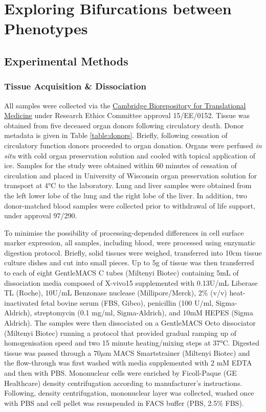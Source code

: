 \chapter{Exploring Bifurcations between Phenotypes}
\label{appendix:exploring}

\section{Experimental Methods}
\subsection{Tissue Acquisition \& Dissociation} 

All samples were collected via the \href{https://www.cbtm.group.cam.ac.uk}{Cambridge Biorepository for Translational Medicine} under Research Ethics Committee approval 15/EE/0152. Tissue was obtained from five deceased organ donors following circulatory death. Donor metadata is given in Table \ref{table:donors}. Briefly, following cessation of circulatory function donors proceeded to organ donation. Organs were perfused \emph{in situ} with cold organ preservation solution and cooled with topical application of ice. Samples for the study were obtained within 60 minutes of cessation of circulation and placed in University of Wisconsin organ preservation solution for transport at 4°C to the laboratory. Lung and liver samples were obtained from the left lower lobe of the lung and the right lobe of the liver. In addition, two donor-matched blood samples were collected prior to withdrawal of life support, under approval 97/290.

To minimise the possibility of processing-depended differences in cell surface marker expression, all samples, including blood, were processed using enzymatic digestion protocol. Briefly, solid tissues were weighed, transferred into 10cm tissue culture dishes and cut into small pieces. Up to 5g of tissue was then transferred to each of eight GentleMACS C tubes (Miltenyi Biotec) containing 5mL of dissociation media composed of X-vivo15 supplemented with 0.13U/mL Liberase TL (Roche), 10U/mL Benzonase nuclease (Millipore/Merck), 2\% (v/v) heat-inactivated fetal bovine serum (FBS, Gibco), penicillin (100 U/ml, Sigma-Aldrich), streptomycin (0.1 mg/ml, Sigma-Aldrich), and 10mM HEPES (Sigma Aldrich). The samples were then dissociated on a GentleMACS Octo dissociator (Miltenyi Biotec) running a protocol that provided gradual ramping up of homogenisation speed and two 15 minute heating/mixing steps at 37°C. Digested tissue was passed through a 70$\mu$m MACS Smartstrainer (Miltenyi Biotec) and the flow-through was first washed with media supplemented with 2 mM EDTA and then with PBS. Mononuclear cells were enriched by Ficoll-Paque (GE Healthcare) density centrifugation according to manufacturer's instructions. Following, density centrifugation, mononuclear layer was collected, washed once with PBS and cell pellet was resuspended in FACS buffer (PBS, 2.5$\%$ FBS).

